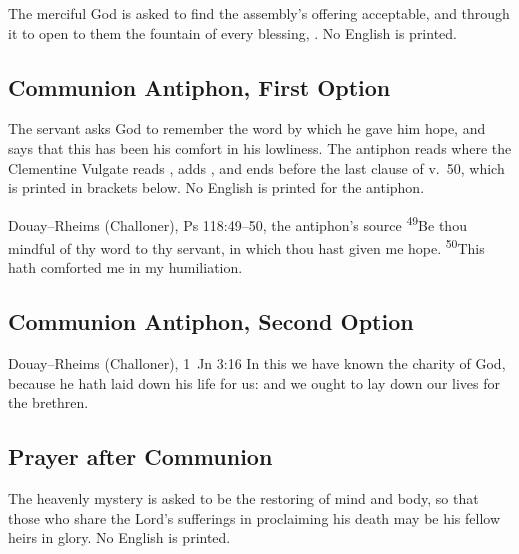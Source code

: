 
\noindent The merciful God is asked to find the assembly's offering
acceptable, and through it to open to them the fountain of every blessing,
. No English is printed.

\subsection{Communion Antiphon, First Option}
\label{proper-communion-antiphon-a}


\noindent The servant asks God to remember the word by which he gave him hope,
and says that this has been his comfort in his lowliness. The antiphon reads
 where the Clementine Vulgate reads , adds
, and ends before the last clause of v.~50, which is printed in
brackets below. No English is printed for the antiphon.

\begin{englishwitness}{Douay--Rheims (Challoner), Ps 118:49--50, the antiphon's source}
\textsuperscript{49}Be thou mindful of thy word to thy servant, in which thou
hast given me hope. \textsuperscript{50}This hath comforted me in my
humiliation.
\end{englishwitness}

\subsection{Communion Antiphon, Second Option}
\label{proper-communion-antiphon-b}


\begin{englishwitness}{Douay--Rheims (Challoner), 1~Jn 3:16}
In this we have known the charity of God, because he hath laid down his life
for us: and we ought to lay down our lives for the brethren.
\end{englishwitness}

\subsection{Prayer after Communion}
\label{proper-prayer-after-communion}


\noindent The heavenly mystery is asked to be the restoring of mind and body,
so that those who share the Lord's sufferings in proclaiming his death may be
his fellow heirs in glory. No English is printed.
